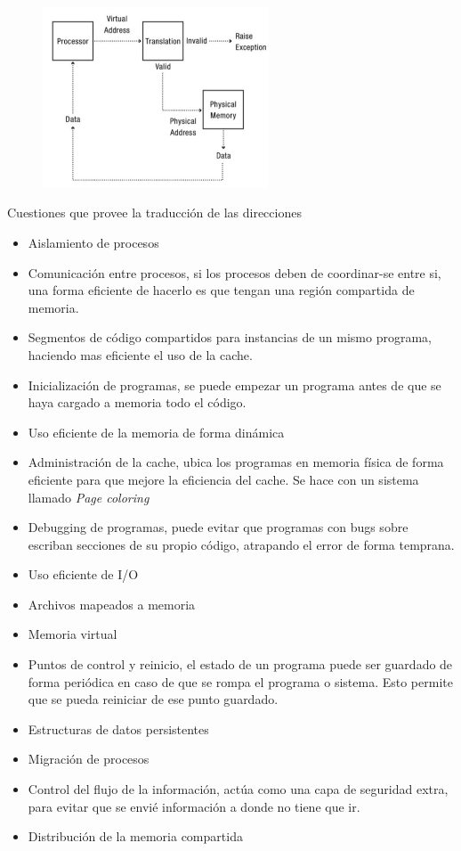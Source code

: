 \documentclass[titlepage,a4paper]{article}
\begin{document}
\begin{figure}[!htb]
    \centering
    \includegraphics[width=0.6\textwidth]{ImagenesApunte/address_translation_function.jpg}
\end{figure}

Cuestiones que provee la traducción de las direcciones
\begin{itemize}
\item Aislamiento de procesos
\item Comunicación entre procesos, si los procesos deben de coordinar-se entre si, una forma eficiente de hacerlo es que tengan una región compartida de memoria. 
\item Segmentos de código compartidos para instancias de un mismo programa, haciendo mas eficiente el uso de la cache.
\item Inicialización de programas, se puede empezar un programa antes de que se haya cargado a memoria todo el código.
\item Uso eficiente de la memoria de forma dinámica
\item Administración de la cache, ubica los programas en memoria física de forma eficiente para que mejore la eficiencia del cache. Se hace con un sistema llamado \textit{Page coloring}
\item Debugging de programas, puede evitar que programas con bugs sobre escriban secciones de su propio código, atrapando el error de forma temprana.
\item Uso eficiente de I/O
\item Archivos mapeados a memoria
\item Memoria virtual
\item Puntos de control y reinicio, el estado de un programa puede ser guardado de forma periódica en caso de que se rompa el programa o sistema. Esto permite que se pueda reiniciar de ese punto guardado.
\item Estructuras de datos persistentes
\item Migración de procesos
\item Control del flujo de la información, actúa como una capa de seguridad extra, para evitar que se envié información a donde no tiene que ir.
\item Distribución de la memoria compartida
\end{itemize}
\end{document}
